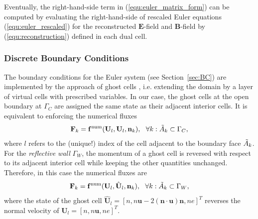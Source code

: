\documentclass{article}
\begin{document}
Eventually, the right-hand-side term in (\ref{equ:euler_matrix_form}) can be computed by
evaluating the right-hand-side of rescaled Euler equations (\ref{equ:euler_rescaled}) for
the reconstructed $\mathbf{E}$-field and $\mathbf{B}$-field by (\ref{equ:reconstruction})
defined in each dual cell.

\subsubsection{Discrete Boundary Conditions}

The boundary conditions for the Euler system (see Section~\ref{sec:BC}) are implemented by
the approach of ghost cells \cite[][Chapt.~7]{leveque_2007}, i.e. extending the domain by a
layer of virtual cells with prescribed variables. In our case, the ghost cells at the open
boundary at $\Gamma_C$ are assigned the same state as their adjacent interior cells. It is
equivalent to enforcing the numerical fluxes
\begin{equation} \label{equ:discrete_open_bc}
    \mathbf{F}_k = {\mathbf{f}^\text{num}}(\mathbf{U}_l, \mathbf{U}_l, \mathbf{n}_k), \ \ \forall k: \Tilde{A}_k \subset \Gamma_C,
\end{equation}
where $l$ refers to the (unique!) index of the cell adjacent to the boundary face
$\Tilde{A}_k$. For the \emph{reflective wall} $\Gamma_W$, the momentum of a ghost cell is
reversed with respect to its adjacent interior cell while keeping the other quantities
unchanged. Therefore, in this case the numerical fluxes are
\begin{equation} \label{equ:discrete_wall_bc} \mathbf{F}_k =
  \mathbf{f}^\text{num}(\mathbf{U}_l, \hat{\mathbf{U}}_l, \mathbf{n}_k), \ \ \forall k:
  \Tilde{A}_k \subset \Gamma_W,
\end{equation}
where the state of the ghost cell
$\hat{\mathbf{U}}_l = [n, n\mathbf{u} - 2(\mathbf{n}\cdot\mathbf{u})\mathbf{n}, ne]^T$
reverses the normal velocity of $\mathbf{U}_l = [n, n\mathbf{u}, ne]^T$.
\end{document}
